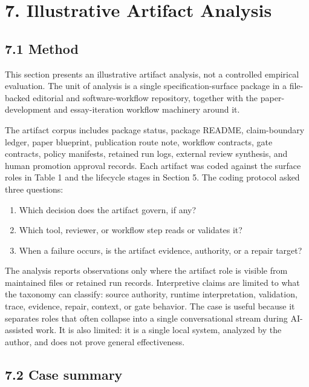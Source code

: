 \documentclass[
]{article}
\providecommand{\tightlist}{%
  \setlength{\itemsep}{0pt}\setlength{\parskip}{0pt}}
\begin{document}
\section{7. Illustrative Artifact
Analysis}\label{illustrative-artifact-analysis}

\subsection{7.1 Method}\label{method}

This section presents an illustrative artifact analysis, not a
controlled empirical evaluation. The unit of analysis is a single
specification-surface package in a file-backed editorial and
software-workflow repository, together with the paper-development and
essay-iteration workflow machinery around it.

The artifact corpus includes package status, package README,
claim-boundary ledger, paper blueprint, publication route note, workflow
contracts, gate contracts, policy manifests, retained run logs, external
review synthesis, and human promotion approval records. Each artifact
was coded against the surface roles in Table 1 and the lifecycle stages
in Section 5. The coding protocol asked three questions:

\begin{enumerate}
\def\labelenumi{\arabic{enumi}.}
\tightlist
\item
  Which decision does the artifact govern, if any?
\item
  Which tool, reviewer, or workflow step reads or validates it?
\item
  When a failure occurs, is the artifact evidence, authority, or a
  repair target?
\end{enumerate}

The analysis reports observations only where the artifact role is
visible from maintained files or retained run records. Interpretive
claims are limited to what the taxonomy can classify: source authority,
runtime interpretation, validation, trace, evidence, repair, context, or
gate behavior. The case is useful because it separates roles that often
collapse into a single conversational stream during AI-assisted work. It
is also limited: it is a single local system, analyzed by the author,
and does not prove general effectiveness.

\subsection{7.2 Case summary}\label{case-summary}
\end{document}
